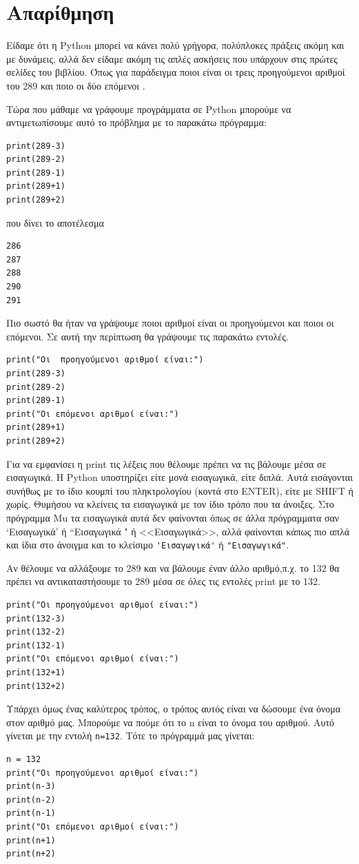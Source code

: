 \section{Απαρίθμηση}
Είδαμε ότι η Python μπορεί να κάνει πολύ γρήγορα, πολύπλοκες πράξεις ακόμη και με δυνάμεις, αλλά δεν είδαμε ακόμη τις απλές ασκήσεις που υπάρχουν στις πρώτες σελίδες του βιβλίου. Όπως για παράδειγμα ποιοι είναι οι τρεις προηγούμενοι αριθμοί του 289 και ποιο οι δύο επόμενοι .

Τώρα που μάθαμε να γράφουμε προγράμματα σε Python μπορούμε να αντιμετωπίσουμε αυτό το πρόβλημα με το παρακάτω πρόγραμμα:
\begin{lstlisting}
print(289-3)
print(289-2)
print(289-1)
print(289+1)
print(289+2)
\end{lstlisting}
που δίνει το αποτέλεσμα
\begin{lstlisting}
286
287
288
290
291
\end{lstlisting}

Πιο σωστό θα ήταν να γράψουμε ποιοι αριθμοί είναι οι προηγούμενοι και ποιοι οι επόμενοι. Σε αυτή την περίπτωση θα γράψουμε τις παρακάτω εντολές.
\begin{lstlisting}
print("Οι  προηγούμενοι αριθμοί είναι:")
print(289-3)
print(289-2)
print(289-1)
print("Οι επόμενοι αριθμοί είναι:")
print(289+1)
print(289+2)
\end{lstlisting}

Για να εμφανίσει η print τις λέξεις που θέλουμε πρέπει να τις βάλουμε μέσα σε εισαγωγικά. Η Python υποστηρίζει είτε μονά εισαγωγικά, είτε διπλά. Αυτά εισάγονται συνήθως με το ίδιο κουμπί του πληκτρολογίου (κοντά στο ENTER), είτε με SHIFT ή χωρίς. Θυμήσου να κλείνεις τα εισαγωγικά με τον ίδιο τρόπο που τα άνοιξες. Στο πρόγραμμα Mu τα εισαγωγικά αυτά δεν φαίνονται όπως σε άλλα πρόγραμματα σαν `Εισαγωγικά' ή ``Εισαγωγικά " ή <<Εισαγωγικά>>, αλλά φαίνονται κάπως πιο απλά και ίδια στο άνοιγμα και το κλείσιμο \lstinline{'Εισαγωγικά'} ή  \lstinline{"Εισαγωγικά"}. 

Αν θέλουμε να αλλάξουμε το 289 και να βάλουμε έναν άλλο αριθμό,π.χ. το 132 θα πρέπει να αντικαταστήσουμε το 289 μέσα σε όλες τις εντολές print με το 132.
\begin{lstlisting}
print("Οι προηγούμενοι αριθμοί είναι:")
print(132-3)
print(132-2)
print(132-1)
print("Οι επόμενοι αριθμοί είναι:")
print(132+1)
print(132+2)
\end{lstlisting}

Υπάρχει όμως ένας καλύτερος τρόπος, ο τρόπος αυτός είναι να δώσουμε ένα όνομα στον αριθμό μας. Μπορούμε να πούμε ότι το n είναι το όνομα του αριθμού. Αυτό γίνεται με την εντολή \lstinline{n=132}. Τότε το πρόγραμμά μας γίνεται:
\begin{lstlisting}
n = 132
print("Οι προηγούμενοι αριθμοί είναι:")
print(n-3)
print(n-2)
print(n-1)
print("Οι επόμενοι αριθμοί είναι:")
print(n+1)
print(n+2)
\end{lstlisting}

